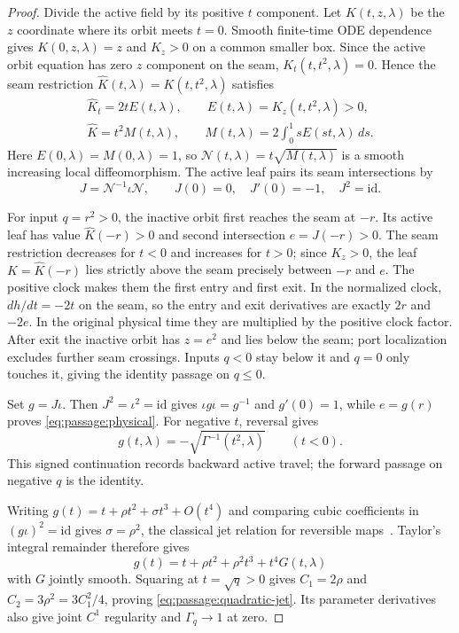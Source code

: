 \begin{proof}
Divide the active field by its positive $t$ component. Let
$K(t,z,\lambda)$ be the $z$ coordinate where its orbit meets $t=0$.
Smooth finite-time ODE dependence gives $K(0,z,\lambda)=z$ and $K_z>0$
on a common smaller box. Since the active orbit equation has zero
$z$ component on the seam, $K_t(t,t^2,\lambda)=0$. Hence the seam
restriction $\widehat K(t,\lambda)=K(t,t^2,\lambda)$ satisfies
\[
 \begin{gathered}
 \widehat K_t=2tE(t,\lambda),\qquad
 E(t,\lambda)=K_z(t,t^2,\lambda)>0,\\
 \widehat K=t^2M(t,\lambda),\qquad
 M(t,\lambda)=2\int_0^1 sE(st,\lambda)\,ds.
 \end{gathered}
\]
Here $E(0,\lambda)=M(0,\lambda)=1$, so
$\mathcal N(t,\lambda)=t\sqrt{M(t,\lambda)}$ is a smooth increasing
local diffeomorphism. The active leaf pairs its seam intersections by
\[
 J=\mathcal N^{-1}\iota\mathcal N,\qquad
 J(0)=0,\quad J'(0)=-1,\quad J^2=\mathrm{id}.
\]

For input $q=r^2>0$, the inactive orbit first reaches the seam at $-r$.
Its active leaf has value $\widehat K(-r)>0$ and second intersection
$e=J(-r)>0$. The seam restriction decreases for $t<0$ and increases
for $t>0$; since $K_z>0$, the leaf $K=\widehat K(-r)$ lies strictly above the seam
precisely between $-r$ and $e$. The positive clock makes them the first
entry and first exit. In the normalized clock, $dh/dt=-2t$ on the seam, so the entry and exit
derivatives are exactly $2r$ and $-2e$. In the original physical time
they are multiplied by the positive clock factor. After exit the inactive orbit has $z=e^2$
and lies below the seam; port localization excludes further seam crossings.
Inputs $q<0$ stay below it and $q=0$ only touches it, giving the identity
passage on $q\le0$.

Set $g=J\iota$. Then $J^2=\iota^2=\mathrm{id}$ gives
$\iota g\iota=g^{-1}$ and $g'(0)=1$, while $e=g(r)$ proves
\eqref{eq:passage:physical}. For negative $t$, reversal gives
\begin{equation}\label{eq:passage:negative-companion}
 g(t,\lambda)=-\sqrt{\Gamma^{-1}(t^2,\lambda)}\qquad(t<0).
\end{equation}
This signed continuation records backward active travel; the forward
passage on negative $q$ is the identity.

Writing $g(t)=t+\rho t^2+\sigma t^3+O(t^4)$ and comparing cubic
coefficients in $(g\iota)^2=\mathrm{id}$ gives $\sigma=\rho^2$, the
classical jet relation for reversible maps~\cite{ofarrell2008,novaessilva2021}.
Taylor's integral remainder therefore gives
\[
 g(t)=t+\rho t^2+\rho^2t^3+t^4G(t,\lambda)
\]
with $G$ jointly smooth. Squaring at $t=\sqrt q>0$ gives
$C_1=2\rho$ and $C_2=3\rho^2=3C_1^2/4$, proving
\eqref{eq:passage:quadratic-jet}. Its parameter derivatives also give
joint $C^1$ regularity and $\Gamma_q\to1$ at zero.


\end{proof}
